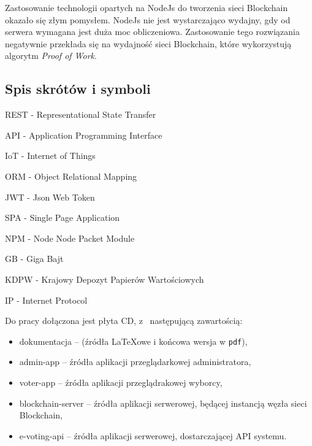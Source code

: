 \documentclass[a4paper,12pt]{book}
\begin{document}
Zastosowanie technologii opartych na NodeJs do tworzenia sieci Blockchain okazało się złym pomysłem. NodeJs nie jest wystarczająco wydajny, gdy od serwera wymagana jest duża moc obliczeniowa. Zastosowanie tego rozwiązania negatywnie przekłada się na wydajność sieci Blockchain, które wykorzystują algorytm \textit{Proof of Work}.

 


\begin{appendices}
 
  \chapter*{Spis skrótów i symboli}
  
  \begin{description}
    \item REST - Representational State Transfer
    \item API - Application Programming Interface
    \item IoT - Internet of Things
    \item ORM - Object Relational Mapping
    \item JWT - Json Web Token
    \item SPA - Single Page Application
    \item NPM - Node Node Packet Module
    \item GB - Giga Bajt
    \item KDPW - Krajowy Depozyt Papierów Wartościowych
    \item IP - Internet Protocol
  \end{description}

\newpage

Do pracy dołączona jest płyta CD, z~ następującą zawartością:

\begin{itemize}
  \item dokumentacja -- (źródła \LaTeX owe i końcowa wersja w \texttt{pdf}),
  \item admin-app -- źródła aplikacji przeglądarkowej administratora,
  \item voter-app -- źródła aplikacji przeglądrakowej wyborcy,
  \item blockchain-server -- źródła aplikacji serwerowej, będącej instancją węzła sieci Blockchain,
  \item e-voting-api -- źródła aplikacji serwerowej, dostarczającej API systemu.
\end{itemize}

\listoffigures

\end{appendices}
\end{document}
